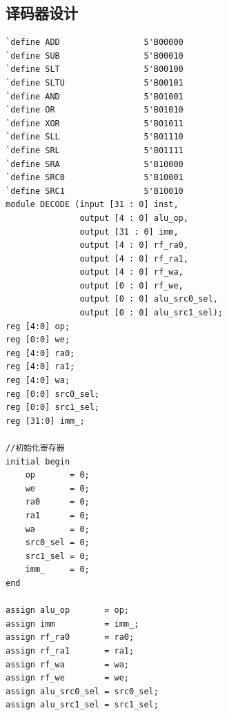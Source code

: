 \documentclass[12pt,a4paper]{ctexart}
\begin{document}
\subsection{译码器设计}
\begin{lstlisting}[style=verilog]
`define ADD                 5'B00000
`define SUB                 5'B00010
`define SLT                 5'B00100
`define SLTU                5'B00101
`define AND                 5'B01001
`define OR                  5'B01010
`define XOR                 5'B01011
`define SLL                 5'B01110
`define SRL                 5'B01111
`define SRA                 5'B10000
`define SRC0                5'B10001
`define SRC1                5'B10010
module DECODE (input [31 : 0] inst,
               output [4 : 0] alu_op,
               output [31 : 0] imm,
               output [4 : 0] rf_ra0,
               output [4 : 0] rf_ra1,
               output [4 : 0] rf_wa,
               output [0 : 0] rf_we,
               output [0 : 0] alu_src0_sel,
               output [0 : 0] alu_src1_sel);
reg [4:0] op;
reg [0:0] we;
reg [4:0] ra0;
reg [4:0] ra1;
reg [4:0] wa;
reg [0:0] src0_sel;
reg [0:0] src1_sel;
reg [31:0] imm_;

//初始化寄存器
initial begin
    op       = 0;
    we       = 0;
    ra0      = 0;
    ra1      = 0;
    wa       = 0;
    src0_sel = 0;
    src1_sel = 0;
    imm_     = 0;
end

assign alu_op       = op;
assign imm          = imm_;
assign rf_ra0       = ra0;
assign rf_ra1       = ra1;
assign rf_wa        = wa;
assign rf_we        = we;
assign alu_src0_sel = src0_sel;
assign alu_src1_sel = src1_sel;


\end{lstlisting}
\end{document}
